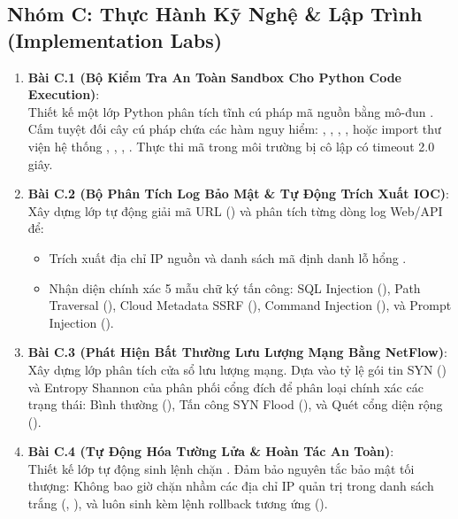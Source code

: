 \subsection{Nhóm C: Thực Hành Kỹ Nghệ \& Lập Trình (Implementation Labs)}
\begin{enumerate}
  \item \textbf{Bài C.1 (Bộ Kiểm Tra An Toàn Sandbox Cho Python Code Execution)}: \\
  Thiết kế một lớp Python  phân tích tĩnh cú pháp mã nguồn bằng mô-đun . Cấm tuyệt đối cây cú pháp chứa các hàm nguy hiểm: , , , , hoặc import thư viện hệ thống , , , . Thực thi mã trong môi trường bị cô lập có timeout 2.0 giây.

  \item \textbf{Bài C.2 (Bộ Phân Tích Log Bảo Mật \& Tự Động Trích Xuất IOC)}: \\
  Xây dựng lớp  tự động giải mã URL () và phân tích từng dòng log Web/API để:
  \begin{itemize}
    \item Trích xuất địa chỉ IP nguồn và danh sách mã định danh lỗ hổng .
    \item Nhận diện chính xác 5 mẫu chữ ký tấn công: SQL Injection (), Path Traversal (), Cloud Metadata SSRF (), Command Injection (), và Prompt Injection ().
  \end{itemize}

  \item \textbf{Bài C.3 (Phát Hiện Bất Thường Lưu Lượng Mạng Bằng NetFlow)}: \\
  Xây dựng lớp  phân tích cửa sổ lưu lượng mạng. Dựa vào tỷ lệ gói tin SYN () và Entropy Shannon của phân phối cổng đích để phân loại chính xác các trạng thái: Bình thường (), Tấn công SYN Flood (), và Quét cổng diện rộng ().

  \item \textbf{Bài C.4 (Tự Động Hóa Tường Lửa \& Hoàn Tác An Toàn)}: \\
  Thiết kế lớp  tự động sinh lệnh chặn . Đảm bảo nguyên tắc bảo mật tối thượng: Không bao giờ chặn nhầm các địa chỉ IP quản trị trong danh sách trắng (, ), và luôn sinh kèm lệnh rollback tương ứng ().


\end{enumerate}
